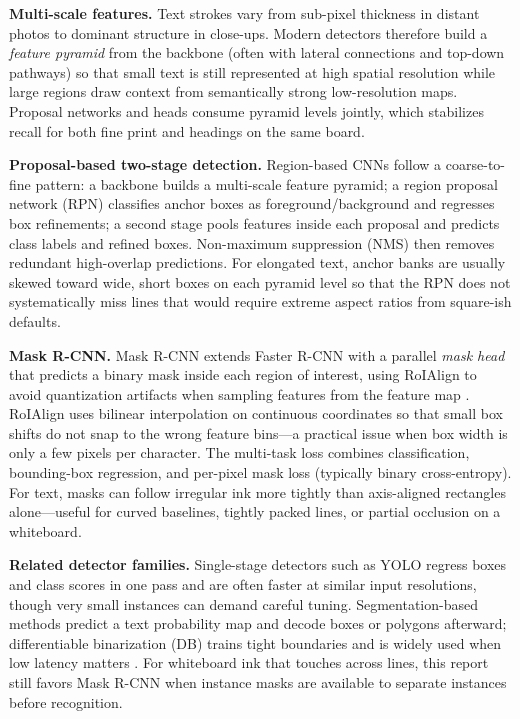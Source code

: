 \documentclass[11pt, a4paper]{article}
\begin{document}
\textbf{Multi-scale features.} Text strokes vary from sub-pixel thickness in distant photos to dominant structure in close-ups. Modern detectors therefore build a \emph{feature pyramid} from the backbone (often with lateral connections and top-down pathways) so that small text is still represented at high spatial resolution while large regions draw context from semantically strong low-resolution maps. Proposal networks and heads consume pyramid levels jointly, which stabilizes recall for both fine print and headings on the same board.

\textbf{Proposal-based two-stage detection.} Region-based CNNs follow a coarse-to-fine pattern: a backbone builds a multi-scale feature pyramid; a region proposal network (RPN) classifies anchor boxes as foreground/background and regresses box refinements; a second stage pools features inside each proposal and predicts class labels and refined boxes. Non-maximum suppression (NMS) then removes redundant high-overlap predictions. For elongated text, anchor banks are usually skewed toward wide, short boxes on each pyramid level so that the RPN does not systematically miss lines that would require extreme aspect ratios from square-ish defaults.

\textbf{Mask R-CNN.} Mask R-CNN extends Faster R-CNN with a parallel \emph{mask head} that predicts a binary mask inside each region of interest, using RoIAlign to avoid quantization artifacts when sampling features from the feature map \cite{he2017maskrcnn}. RoIAlign uses bilinear interpolation on continuous coordinates so that small box shifts do not snap to the wrong feature bins---a practical issue when box width is only a few pixels per character. The multi-task loss combines classification, bounding-box regression, and per-pixel mask loss (typically binary cross-entropy). For text, masks can follow irregular ink more tightly than axis-aligned rectangles alone---useful for curved baselines, tightly packed lines, or partial occlusion on a whiteboard.

\textbf{Related detector families.} Single-stage detectors such as YOLO \cite{redmon2016yolo} regress boxes and class scores in one pass and are often faster at similar input resolutions, though very small instances can demand careful tuning. Segmentation-based methods predict a text probability map and decode boxes or polygons afterward; differentiable binarization (DB) trains tight boundaries and is widely used when low latency matters \cite{liao2020db}. For whiteboard ink that touches across lines, this report still favors Mask R-CNN when instance masks are available to separate instances before recognition.
\end{document}
